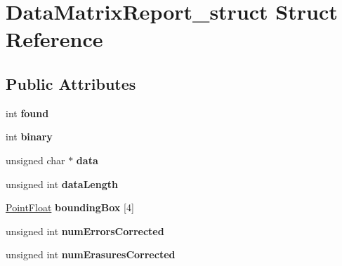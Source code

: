 \hypertarget{structDataMatrixReport__struct}{\section{\-Data\-Matrix\-Report\-\_\-struct \-Struct \-Reference}
\label{structDataMatrixReport__struct}
}
\subsection*{\-Public \-Attributes}
\begin{DoxyCompactItemize}
\item 
\hypertarget{structDataMatrixReport__struct_a0f3fb2b4be8aa61b5fa0a94553479922}{int {\bfseries found}}\label{structDataMatrixReport__struct_a0f3fb2b4be8aa61b5fa0a94553479922}

\item 
\hypertarget{structDataMatrixReport__struct_a4156a3f979387a75a8d97cfa110216e4}{int {\bfseries binary}}\label{structDataMatrixReport__struct_a4156a3f979387a75a8d97cfa110216e4}

\item 
\hypertarget{structDataMatrixReport__struct_af0593dc4e0d9402aa8ef451e630249f9}{unsigned char $\ast$ {\bfseries data}}\label{structDataMatrixReport__struct_af0593dc4e0d9402aa8ef451e630249f9}

\item 
\hypertarget{structDataMatrixReport__struct_a5f1e53ddd180ff4eb3d512190bfdee25}{unsigned int {\bfseries data\-Length}}\label{structDataMatrixReport__struct_a5f1e53ddd180ff4eb3d512190bfdee25}

\item 
\hypertarget{structDataMatrixReport__struct_acb65de27579e014fd4fe2328cefddaf5}{\hyperlink{structPointFloat__struct}{\-Point\-Float} {\bfseries bounding\-Box} \mbox{[}4\mbox{]}}\label{structDataMatrixReport__struct_acb65de27579e014fd4fe2328cefddaf5}

\item 
\hypertarget{structDataMatrixReport__struct_a549194fecd0a9d70de05483eab8deeb2}{unsigned int {\bfseries num\-Errors\-Corrected}}\label{structDataMatrixReport__struct_a549194fecd0a9d70de05483eab8deeb2}

\item 
\hypertarget{structDataMatrixReport__struct_ab7e26832de30994588ca2fb16d32418e}{unsigned int {\bfseries num\-Erasures\-Corrected}}\label{structDataMatrixReport__struct_ab7e26832de30994588ca2fb16d32418e}


\end{DoxyCompactItemize}
